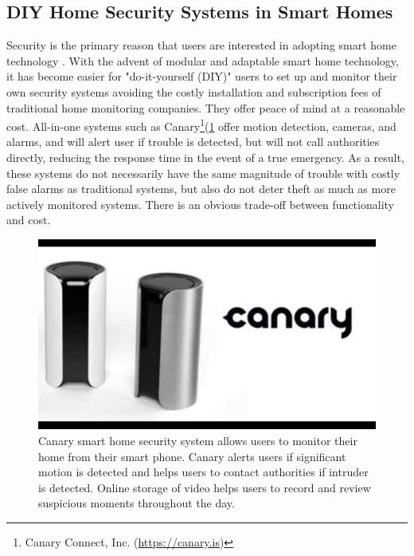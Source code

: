 \subsection{DIY Home Security Systems in Smart Homes}

Security is the primary reason that users are interested in adopting smart home technology \cite{ABIhomeAutomationReport2015}. With the advent of modular and adaptable smart home technology, it has become easier for "do-it-yourself (DIY)" users to set up and monitor their own security systems avoiding the costly installation and subscription fees of traditional home monitoring companies. They offer peace of mind at a reasonable cost. All-in-one systems such as Canary\footnote{Canary Connect, Inc. (\url{https://canary.is})}(\ref{fig:canary.jpg} offer motion detection, cameras, and alarms, and will alert user if trouble is detected, but will not call authorities directly, reducing the response time in the event of a true emergency. As a result, these systems do not necessarily have the same magnitude of trouble with costly false alarms as traditional systems, but also do not deter theft as much as more actively monitored systems. There is an obvious trade-off between functionality and cost. \cite{DIYSecurity}

\begin{figure}[ht]
\centering
	\includegraphics[keepaspectratio, width=6in]{Figures/Benchmarking/canary.jpg}
	\caption{Canary smart home security system allows users to monitor their home from their smart phone. Canary alerts users if significant motion is detected and helps users to contact authorities if intruder is detected. Online storage of video helps users to record and review suspicious moments throughout the day. \protect\footnotemark}
	\label{fig:canary.jpg}
\end{figure}

